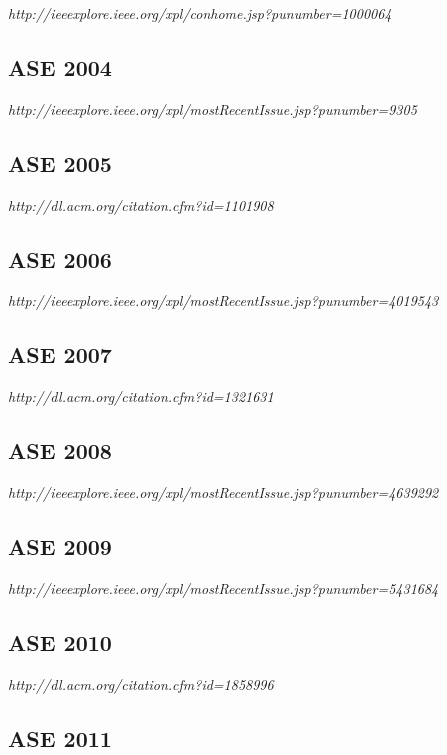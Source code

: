 {\small \em http://ieeexplore.ieee.org/xpl/conhome.jsp?punumber=1000064}

\subsection{ASE 2004}

{\small \em http://ieeexplore.ieee.org/xpl/mostRecentIssue.jsp?punumber=9305}

\subsection{ASE 2005}

{\small \em http://dl.acm.org/citation.cfm?id=1101908}

\subsection{ASE 2006}

{\small \em http://ieeexplore.ieee.org/xpl/mostRecentIssue.jsp?punumber=4019543}

\subsection{ASE 2007}

{\small \em http://dl.acm.org/citation.cfm?id=1321631}

\subsection{ASE 2008}

{\small \em http://ieeexplore.ieee.org/xpl/mostRecentIssue.jsp?punumber=4639292}

\subsection{ASE 2009}

{\small \em http://ieeexplore.ieee.org/xpl/mostRecentIssue.jsp?punumber=5431684}

\subsection{ASE 2010}

{\small \em http://dl.acm.org/citation.cfm?id=1858996}

\subsection{ASE 2011}

